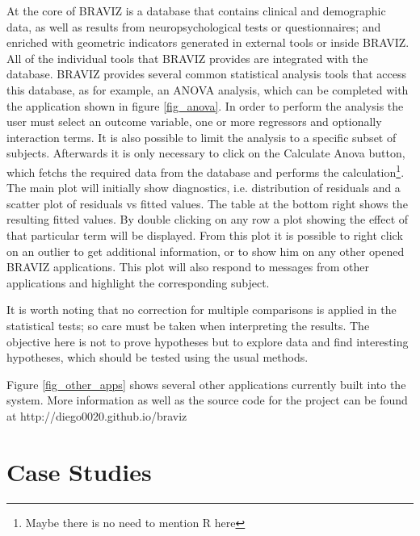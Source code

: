 \documentclass[utf8,paper]{frontiersSCNS} %
\begin{document}
At the core of BRAVIZ is a database that contains clinical and demographic data, as well as results from neuropsychological tests or questionnaires; and enriched with geometric indicators generated in external tools or inside BRAVIZ. All of the individual tools that BRAVIZ provides are integrated with the database. BRAVIZ provides several common statistical analysis tools that access this database, as for example, an ANOVA  analysis, which can be completed with the application shown in figure \ref{fig_anova}. In order to perform the analysis the user must select an outcome variable, one or more regressors and optionally interaction terms. It is also possible to limit the analysis to a specific subset of subjects. Afterwards it is only necessary to click on the Calculate Anova button, which fetchs the required data from the database and performs the calculation\footnote{Maybe there is no need to mention R here}. The main plot will initially show diagnostics, i.e. distribution of residuals and a scatter plot of residuals vs fitted values. The table at the bottom right shows the resulting fitted values. By double clicking on any row a plot showing the effect of that particular term will be displayed. From this plot it is possible to right click on an outlier to get additional information, or to show him on any other opened BRAVIZ applications. This plot will also respond to messages from other applications and highlight the corresponding subject.

It is worth noting that no correction for multiple comparisons is applied in the statistical tests; so care must be taken when interpreting the results. The objective here is not to prove hypotheses but to explore data and find interesting hypotheses, which should be tested using the usual methods.

Figure \ref{fig_other_apps} shows several other applications currently built into the system. More information as well as the source code for the project can be found at http://diego0020.github.io/braviz



\section{Case Studies}
\end{document}
